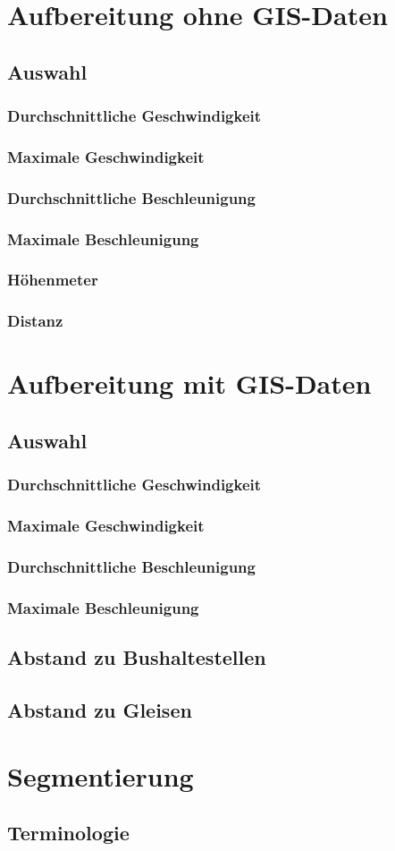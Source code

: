 \pagebreak

\section{Aufbereitung ohne GIS-Daten}
\subsection{Auswahl}
\subsubsection{Durchschnittliche Geschwindigkeit}
\subsubsection{Maximale Geschwindigkeit}
\subsubsection{Durchschnittliche Beschleunigung}
\subsubsection{Maximale Beschleunigung}
\subsubsection{Höhenmeter}
\subsubsection{Distanz}
\pagebreak

\section{Aufbereitung mit GIS-Daten}
\subsection{Auswahl}
\subsubsection{Durchschnittliche Geschwindigkeit}
\subsubsection{Maximale Geschwindigkeit}
\subsubsection{Durchschnittliche Beschleunigung}
\subsubsection{Maximale Beschleunigung}
\subsection{Abstand zu Bushaltestellen}
\subsection{Abstand zu Gleisen}
\pagebreak

\section{Segmentierung}
\subsection{Terminologie}
